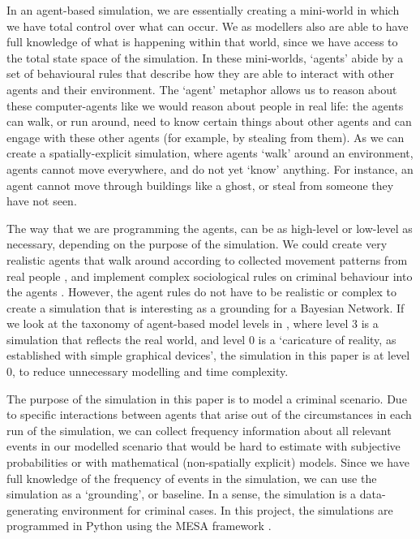 \documentclass[12pt]{article}
\begin{document}
In an agent-based simulation, we are essentially creating a mini-world in which we have total control over what can occur. We as modellers also are able to have full knowledge of what is happening within that world, since we have access to the total state space of the simulation. In these mini-worlds, `agents' abide by a set of behavioural rules that describe how they are able to interact with other agents and their environment. The `agent' metaphor allows us to reason about these computer-agents like we would reason about people in real life: the agents can walk, or run around, need to know certain things about other agents and can engage with these other agents (for example, by stealing from them). As we can create a spatially-explicit simulation, where agents `walk' around an environment, agents cannot move everywhere, and do not yet `know' anything. For instance, an agent cannot move through buildings like a ghost, or steal from someone they have not seen.

The way that we are programming the agents, can be as high-level or low-level as necessary, depending on the purpose of the simulation. We could create very realistic agents that walk around according to collected movement patterns from real people \citep{Zhu2021}, and implement complex sociological rules on criminal behaviour into the agents \citep{Gerritsen2015}. However, the agent rules do not have to be realistic or complex to create a simulation that is interesting as a grounding for a Bayesian Network. If we look at the taxonomy of agent-based model levels in \citep{gilbert2005}, where level 3 is a simulation that reflects the real world, and level 0 is a `caricature of reality, as established with simple graphical devices', the simulation in this paper is at level 0, to reduce unnecessary modelling and time complexity.

The purpose of the simulation in this paper is to model a criminal scenario. Due to specific interactions between agents that arise out of the circumstances in each run of the simulation, we can collect frequency information about all relevant events in our modelled scenario that would be hard to estimate with subjective probabilities or with mathematical (non-spatially explicit) models. Since we have full knowledge of the frequency of events in the simulation, we can use the simulation as a `grounding', or baseline. In a sense, the simulation is a data-generating environment for criminal cases.  In this project, the simulations are programmed in Python using the MESA framework  \citep{mesa2020}.
\end{document}
